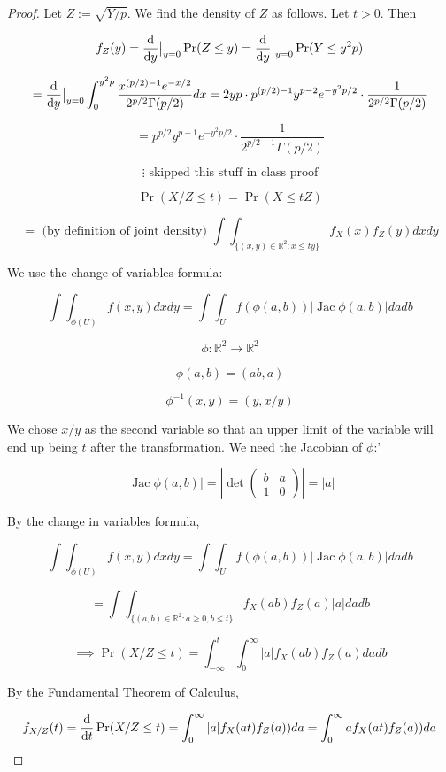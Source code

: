 \begin{proof} Let \(Z:= \sqrt{Y/p}\). We find the density of \(Z\) as follows. Let \(t > 0\). Then

\[
f_Z(y) = \deriv{}{y}\big|_{y=0} \Pr(Z \leq y) = \deriv{}{y} \big|_{y=0} \Pr(Y \leq y^2p) 
\]

\[
=  \deriv{}{y} \big|_{y=0} \int_0^{y^2p} \frac{x^{(p/2)-1}e^{-x/2}}{2^{p/2} \Gamma(p/2)} dx = 2yp \cdot p^{(p/2)-1} y^{p-2}e^{-y^2p/2} \cdot \frac{1}{2^{p/2} \Gamma(p/2)}
\]

\[
=p^{p/2}y^{p-1}e^{-y^2 p/2} \cdot \frac{1}{2^{p/2-1} \Gamma(p/2)}
\] 

\[
\vdots \text{ skipped this stuff in class proof}
\]

\[
\Pr(X/Z \leq t) = \Pr(X \leq tZ) 
\]

\[
= \text{ (by definition of joint density) }  \int \int_{\{ (x,y) \in \mathbb{R}^2: x \leq ty \} } f_X(x) f_Z(y) dx dy
\]

We use the change of variables formula:

\[
\int \int_{\phi(U)} f(x,y) dxdy = \int \int_U f(\phi(a,b)) | \operatorname{Jac} \phi(a,b)| da db
\]

\[
\phi: \mathbb{R}^2 \to \mathbb{R}^2
\]

\[
\phi(a,b) = (ab,a)
\]

\[
\phi^{-1}(x,y) =(y, x/y)
\]

We chose \(x/y\) as the second variable so that an upper limit of the variable will end up being \(t\) after the transformation. We need the Jacobian of \(\phi\):'

\[
| \operatorname{Jac} \phi(a,b) | = \left| \operatorname{det} \begin{pmatrix} b & a \\ 1 & 0 \end{pmatrix} \right| = |a|
\]

By the change in variables formula,

\[
\int \int_{\phi(U)} f(x,y) dx dy = \int \int_U f(\phi(a,b)) \left| \operatorname{Jac} \phi(a,b) \right| da db
\]

\[
 = \int \int_{\{ (a,b) \in \mathbb{R}^2: a \geq 0, b \leq t \} }  f_X(ab) f_Z(a) \left| a \right| da db
\]

\[
\implies \Pr(X/Z \leq t) = \int_{-\infty}^t \int_0^\infty |a|  f_X(ab) f_Z(a) da db
\]

By the Fundamental Theorem of Calculus,

\[
f_{X/Z}(t) = \deriv{}{t} \Pr(X/Z \leq t) = \int_0^\infty |a|  f_X(at) f_Z(a)) da = \int_0^\infty a f_X(at) f_Z(a)) da
\]


\end{proof}

